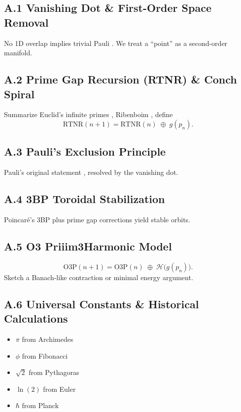 \documentclass[11pt]{article}
\begin{document}
\subsection{A.1 Vanishing Dot \& First-Order Space Removal}
No 1D overlap implies trivial Pauli \cite{Pauli1925}. We treat a “point” as a second-order manifold.

\subsection{A.2 Prime Gap Recursion (RTNR) \& Conch Spiral}
Summarize Euclid’s infinite primes \cite{Euclid300BC}, Ribenboim \cite{Ribenboim1996}, define
\[
\mathrm{RTNR}(n+1) = \mathrm{RTNR}(n) \;\oplus\; g(p_n).
\]

\subsection{A.3 Pauli’s Exclusion Principle}
Pauli’s original statement \cite{Pauli1925}, resolved by the vanishing dot.

\subsection{A.4 3BP Toroidal Stabilization}
Poincaré’s 3BP \cite{Poincare1892} plus prime gap corrections yield stable orbits.

\subsection{A.5 O3 Priiim3Harmonic Model}
\[
\mathrm{O3P}(n+1) 
= \mathrm{O3P}(n) 
\;\oplus\; 
\mathcal{H}\bigl(g(p_n)\bigr).
\tag{A.5}
\]
Sketch a Banach-like contraction or minimal energy argument.

\subsection{A.6 Universal Constants \& Historical Calculations}
\begin{itemize}
    \item $\pi$ from Archimedes \cite{Archimedes287BC}
    \item $\phi$ from Fibonacci \cite{Fibonacci1202}
    \item $\sqrt{2}$ from Pythagoras \cite{Pythagoras500BC}
    \item $\ln(2)$ from Euler \cite{Euler1736}
    \item $\hbar$ from Planck \cite{Planck1900}
\end{itemize}
\end{document}
